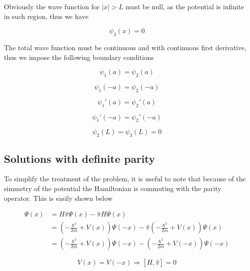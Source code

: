 \documentclass{article}
\begin{document}
Obviously the wave function for \(\left|x\right| > L\) must be null, as the potential is infinite in such region, thus we have

\begin{equation}
\psi_{3}(x) = 0
\end{equation}

The total wave function must be continuous and with continuous first derivative, thus we impose the following boundary conditions

\begin{equation}
\label{eq:continuity}
\psi_{1}(a) =  \psi_{2}(a)
\end{equation}

\begin{equation}
\psi_{1}(-a) =  \psi_{2}(-a)
\end{equation}

\begin{equation}
\label{eq:continuity_derivative}
\psi_{1}'(a) =  \psi_{2}'(a)
\end{equation}

\begin{equation}
\psi_{1}'(-a) =  \psi_{2}'(-a)
\end{equation}

\begin{equation}
\label{eq:null_bound}
\psi_{2}(L) =  \psi_{3}(L) = 0
\end{equation}

\subsection{Solutions with definite parity}
To simplify the treatment of the problem, it is useful to note that because of the simmetry of the potential the Hamiltonian is commuting with the parity operator. This is easily shown below

\begin{align*}
[H, \hat{\pi}] \Psi(x) & = H \hat{\pi} \Psi(x) - \hat{\pi} H \Psi(x) \\ 
  & = \left(-\frac{\hbar^2}{2m} + V(x)\right)\Psi(-x) -  \hat{\pi} \left(-\frac{\hbar^2}{2m} + V(x)\right)\Psi(x) \\ & = \left(-\frac{\hbar^2}{2m} + V(x)\right)\Psi(-x) -  \left(-\frac{\hbar^2}{2m} + V(-x)\right)\Psi(-x)
\end{align*}

\begin{equation}
\label{eq:parity_commutation}
V(x) = V(-x) \Rightarrow \left[H,\hat{\pi} \right] = 0
\end{equation}
\end{document}

